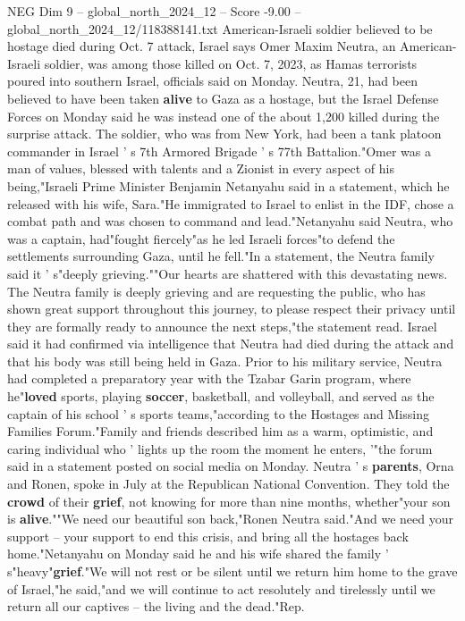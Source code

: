 \begin{textsample}{NEG Dim 9 – global\_north\_2024\_12 – Score -9.00 – global\_north\_2024\_12/118388141.txt}  \label{ex:f9_neg_114}
American-Israeli soldier believed to be hostage died during Oct. 7 attack, Israel says Omer Maxim Neutra, an American-Israeli soldier, was among those killed on Oct. 7, 2023, as Hamas terrorists poured into southern Israel, officials said on Monday.
Neutra, 21, had been believed to have been taken \textbf{alive} to Gaza as a hostage, but the Israel Defense Forces on Monday said he was instead one of the about 1,200 killed during the surprise attack.
The soldier, who was from New York, had been a tank platoon commander in Israel ' s 7th Armored Brigade ' s 77th Battalion."Omer was a man of values, blessed with talents and a Zionist in every aspect of his being,"Israeli Prime Minister Benjamin Netanyahu said in a statement, which he released with his wife, Sara."He immigrated to Israel to enlist in the IDF, chose a combat path and was chosen to command and lead."Netanyahu said Neutra, who was a captain, had"fought fiercely"as he led Israeli forces"to defend the settlements surrounding Gaza, until he fell."In a statement, the Neutra family said it ' s"deeply grieving.""Our hearts are shattered with this devastating news.
The Neutra family is deeply grieving and are requesting the public, who has shown great support throughout this journey, to please respect their privacy until they are formally ready to announce the next steps,"the statement read.
Israel said it had confirmed via intelligence that Neutra had died during the attack and that his body was still being held in Gaza.
Prior to his military service, Neutra had completed a preparatory year with the Tzabar Garin program, where he"\textbf{loved} sports, playing \textbf{soccer}, basketball, and volleyball, and served as the captain of his school ' s sports teams,"according to the Hostages and Missing Families Forum."Family and friends described him as a warm, optimistic, and caring individual who ' lights up the room the moment he enters, '"the forum said in a statement posted on social media on Monday.
Neutra ' s \textbf{parents}, Orna and Ronen, spoke in July at the Republican National Convention.
They told the \textbf{crowd} of their \textbf{grief}, not knowing for more than nine months, whether"your son is \textbf{alive}.""We need our beautiful son back,"Ronen Neutra said."And we need your support -- your support to end this crisis, and bring all the hostages back home."Netanyahu on Monday said he and his wife shared the family ' s"heavy"\textbf{grief}."We will not rest or be silent until we return him home to the grave of Israel,"he said,"and we will continue to act resolutely and tirelessly until we return all our captives -- the living and the dead."Rep.

\end{textsample}
